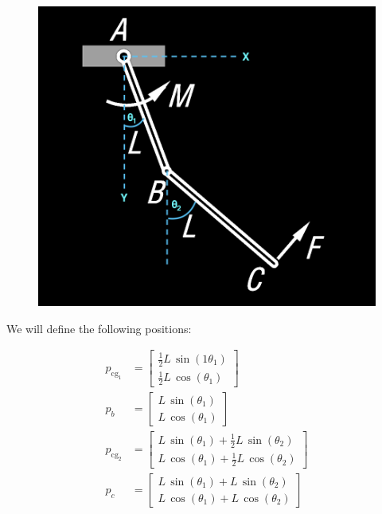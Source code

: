 \documentclass[12pt, letterpaper]{../assignment}
\begin{document}
\begin{figure}[H]
    \centering
    \includegraphics[scale=0.35,frame]{images/Problem_2_cf.png}
\end{figure}

We will define the following positions:

\begin{equation*}
    \begin{aligned}
        p_{\text{cg}_1} &= \left[\begin{array}{c}
            \frac{1}{2}L\,\sin \left(1\theta_1 \right)\\
            \frac{1}{2}L\,\cos \left(\theta_1 \right)
            \end{array}\right]\\
        p_b &= \left[\begin{array}{c}
            L\,\sin \left(\theta_1 \right)\\
            L\,\cos \left(\theta_1 \right)
            \end{array}\right] \\
        p_{\text{cg}_2} &= \left[\begin{array}{c}
            L\,\sin \left(\theta_1 \right)+\frac{1}{2}L\,\sin \left(\theta_2 \right)\\
            L\,\cos \left(\theta_1 \right)+\frac{1}{2}L\,\cos \left(\theta_2 \right)
            \end{array}\right]\\
        p_c &= \left[\begin{array}{c}
            L\,\sin \left(\theta_1 \right)+L\,\sin \left(\theta_2 \right)\\
            L\,\cos \left(\theta_1 \right)+L\,\cos \left(\theta_2 \right)
            \end{array}\right]
    \end{aligned}
\end{equation*}
\end{document}
